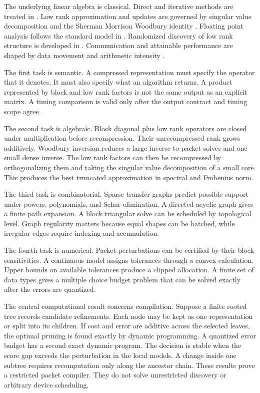 \documentclass{aomart}
\theoremstyle{definition}
\theoremstyle{remark}
\begin{document}
The underlying linear algebra is classical. Direct and iterative methods are treated in \cite{GolubVanLoan2013,Saad2003,Davis2006}. Low rank approximation and updates are governed by singular value decomposition and the Sherman Morrison Woodbury identity \cite{EckartYoung1936,Mirsky1960,Hager1989,BunchNielsen1978}. Floating point analysis follows the standard model in \cite{Higham2002,IEEE7542019}. Randomized discovery of low rank structure is developed in \cite{HalkoMartinssonTropp2011,MartinssonTropp2020}. Communication and attainable performance are shaped by data movement and arithmetic intensity \cite{HongKung1981,WilliamsWatermanPatterson2009,BallardDemmelHoltzSchwartz2011,FrigoLeisersonProkopRamachandran1999}.

The first task is semantic. A compressed representation must specify the operator that it denotes. It must also specify what an algorithm returns. A product represented by block and low rank factors is not the same output as an explicit matrix. A timing comparison is valid only after the output contract and timing scope agree.

The second task is algebraic. Block diagonal plus low rank operators are closed under multiplication before recompression. Their unrecompressed rank grows additively. Woodbury inversion reduces a large inverse to packet solves and one small dense inverse. The low rank factors can then be recompressed by orthogonalizing them and taking the singular value decomposition of a small core. This produces the best truncated approximation in spectral and Frobenius norm.

The third task is combinatorial. Sparse transfer graphs predict possible support under powers, polynomials, and Schur elimination. A directed acyclic graph gives a finite path expansion. A block triangular solve can be scheduled by topological level. Graph regularity matters because equal shapes can be batched, while irregular edges require indexing and accumulation.

The fourth task is numerical. Packet perturbations can be certified by their block sensitivities. A continuous model assigns tolerances through a convex calculation. Upper bounds on available tolerances produce a clipped allocation. A finite set of data types gives a multiple choice budget problem that can be solved exactly after the errors are quantized.

The central computational result concerns compilation. Suppose a finite rooted tree records candidate refinements. Each node may be kept as one representation or split into its children. If cost and error are additive across the selected leaves, the optimal pruning is found exactly by dynamic programming. A quantized error budget has a second exact dynamic program. The decision is stable when the score gap exceeds the perturbation in the local models. A change inside one subtree requires recomputation only along the ancestor chain. These results prove a restricted packet compiler. They do not solve unrestricted discovery or arbitrary device scheduling.
\end{document}

